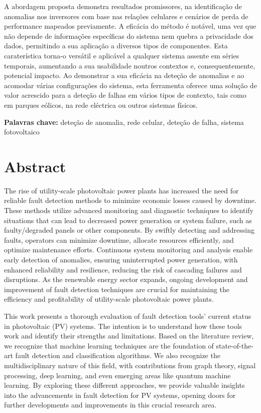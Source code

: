 A abordagem proposta demonstra resultados promissores, na identificação de anomalias nos inversores com base nas relações celulares e cenários de perda de performance mapeados previamente. A eficácia do método é notável, uma vez que não depende de informações específicas do sistema nem quebra a privacidade dos dados, permitindo a sua aplicação a diversos tipos de componentes. Esta caraterística torna-o versátil e aplicável a qualquer sistema assente em séries temporais, aumentando a sua usabilidade noutros contextos e, consequentemente, potencial impacto. Ao demonstrar a sua eficácia na deteção de anomalias e ao acomodar várias configurações do sistema, esta ferramenta oferece uma solução de valor acrescido para a deteção de falhas em vários tipos de contexto, tais como em parques eólicos, na rede eléctrica ou outros sistemas físicos.

\bigskip

\textbf{Palavras chave:} deteção de anomalia, rede celular, deteção de falha, sistema fotovoltaico

\chapter*{Abstract}
The rise of utility-scale photovoltaic power plants has increased the need for reliable fault detection methods to minimize economic losses caused by downtime. These methods utilize advanced monitoring and diagnostic techniques to identify situations that can lead to decreased power generation or system failure, such as faulty/degraded panels or other components. By swiftly detecting and addressing faults, operators can minimize downtime, allocate resources efficiently, and optimize maintenance efforts. Continuous system monitoring and analysis enable early detection of anomalies, ensuring uninterrupted power generation, with enhanced reliability and resilience, reducing the risk of cascading failures and disruptions. As the renewable energy sector expands, ongoing development and improvement of fault detection techniques are crucial for maintaining the efficiency and profitability of utility-scale photovoltaic power plants.

This work presents a thorough evaluation of fault detection tools' current status in photovoltaic (PV) systems. The intention is to understand how these tools work and identify their strengths and limitations. Based on the literature review, we recognize that machine learning techniques are the foundation of state-of-the-art fault detection and classification algorithms. We also recognize the multidisciplinary nature of this field, with contributions from graph theory, signal processing, deep learning, and even emerging areas like quantum machine learning. By exploring these different approaches, we provide valuable insights into the advancements in fault detection for PV systems, opening doors for further developments and improvements in this crucial research area.

